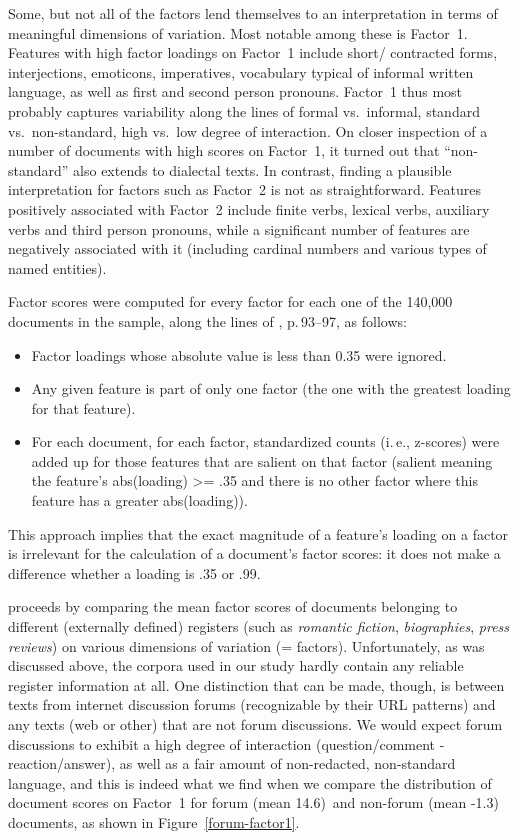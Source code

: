 Some, but not all of the factors lend themselves to an interpretation in terms of meaningful dimensions of variation.
Most notable among these is Factor~1.
Features with high factor loadings on Factor~1 include short/ contracted forms, interjections, emoticons, imperatives, vocabulary typical of informal written language, as well as first and second person pronouns.
Factor~1 thus most probably captures variability along the lines of formal vs.\ informal, standard vs.\ non-standard, high vs.\ low degree of interaction.
On closer inspection of a number of documents with high scores on Factor~1, it turned out that ``non-standard'' also extends to dialectal texts.
In contrast, finding a plausible interpretation for factors such as Factor~2 is not as straightforward.
Features positively associated with Factor~2 include finite verbs, lexical verbs, auxiliary verbs and third person pronouns, while a significant number of features are negatively associated with it (including cardinal numbers and various types of named entities).

Factor scores were computed for every factor for each one of the 140,000 documents in the sample, along the lines of \cite{Biber1988}, p.\,93--97, as follows:

\begin{itemize}
  \item Factor loadings whose absolute value is less than 0.35 were ignored.
  \item Any given feature is part of only one factor (the one with the greatest loading for that feature).
  \item For each document, for each factor, standardized counts (i.\,e., z-scores) were added up for those features that are salient on that factor (salient meaning the feature's abs(loading) >= .35 and there is no other factor where this feature has a greater abs(loading)).
\end{itemize}

This approach implies that the exact magnitude of a feature's  loading on a factor is irrelevant for the calculation of a document's factor scores: it does not make a difference whether a loading is .35 or .99.

\cite{Biber1988} proceeds by comparing the mean factor scores of documents belonging to different (externally defined) registers (such as \textit{romantic fiction}, \textit{biographies}, \textit{press reviews}) on various dimensions of variation (= factors).
Unfortunately, as was discussed above, the corpora used in our study hardly contain any reliable register information at all.
One distinction that can be made, though, is between texts from internet discussion forums (recognizable by their URL patterns) and any texts (web or other) that are not forum discussions.
We would expect forum discussions to exhibit a high degree of interaction (question/comment - reaction/answer), as well as a fair amount of non-redacted, non-standard language, and this is indeed what we find when we compare the distribution of document scores on Factor~1 for forum (mean 14.6) and non-forum (mean -1.3) documents, as shown in Figure~\ref{forum-factor1}.

